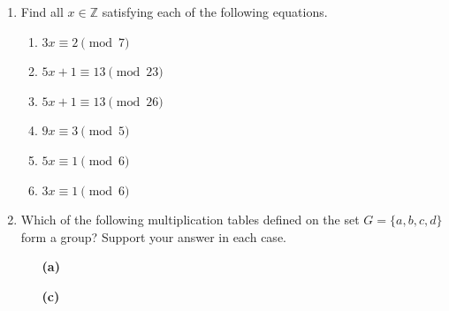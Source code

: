 {\small
\begin{enumerate}

\item
Find all $x \in {\mathbb Z}$ satisfying each of the following equations.
\begin{multicols}{2}
\begin{enumerate}

\item 
$3x \equiv 2 \pmod{ 7}$

\item
$5x + 1 \equiv 13 \pmod{ 23}$

\item
$5x + 1 \equiv 13 \pmod{ 26}$

\item
$9x \equiv 3 \pmod{ 5}$

\item
$5x \equiv 1 \pmod{ 6}$

\item
$3x \equiv 1 \pmod{ 6}$

\end{enumerate}

\end{multicols}
  
 
\item   %
Which of the following multiplication tables defined on the set $G =
\{ a, b, c, d \}$ form a group? Support your answer in each case. 
 
\vspace{3pt}        %
 
\hspace{-7pt}
\begin{minipage}[t]{4.6in}
\noindent
\begin{minipage}[t]{2.25in}
\begin{itemize}
 
 \item[{\bf (a)}]
 
 
 \item[{\bf (c)}]
 

\end{itemize}
\end{minipage}
\end{minipage}
\end{enumerate}}
